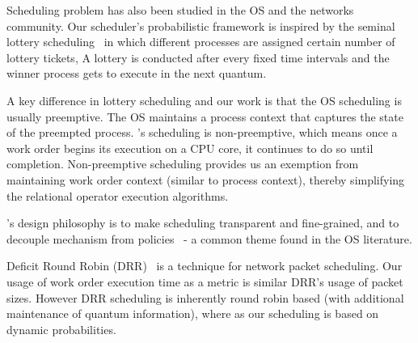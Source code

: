 Scheduling problem has also been studied in the OS and the networks community. 
Our scheduler's probabilistic framework is inspired by the seminal lottery scheduling~\cite{lottery-scheduling} %
in which different processes are assigned certain number of lottery tickets,
A lottery is conducted after every fixed time intervals and the winner process gets to execute in the next quantum. 

A key difference in lottery scheduling and our work is that the OS scheduling is usually preemptive. %
The OS maintains a process context that captures the state of the preempted process. 
\sys{}'s scheduling is non-preemptive, which means once a work order begins its execution on a CPU core, it continues to do so until completion.
Non-preemptive scheduling provides us an exemption from maintaining work order context (similar to process context), thereby simplifying the relational operator execution algorithms.


\sys{}'s design philosophy is to make scheduling transparent and fine-grained, and to decouple mechanism from policies~\cite{LampsonS76} - a common theme found in the OS literature.

Deficit Round Robin (DRR)~\cite{shreedhar1996efficient} is a technique for network packet scheduling.
Our usage of work order execution time as a metric is similar DRR's usage of packet sizes. 
However DRR scheduling is inherently round robin based (with additional maintenance of quantum information), where as our scheduling is based on dynamic probabilities. 


